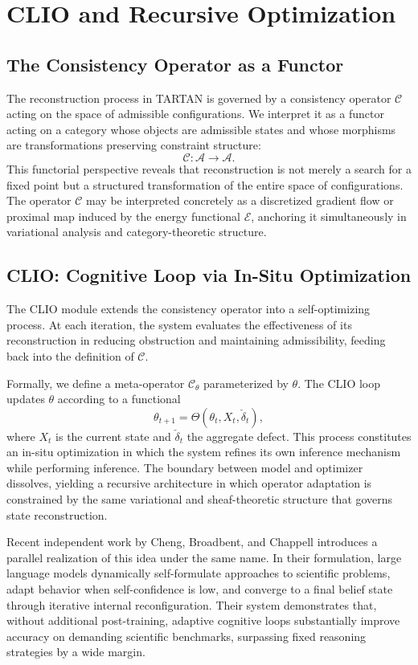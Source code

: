 \documentclass[12pt, oneside]{article}
\begin{document}
\section{CLIO and Recursive Optimization}
\label{sec:clio}

\subsection{The Consistency Operator as a Functor}

The reconstruction process in TARTAN is governed by a consistency operator $\mathcal{C}$ acting on the space of admissible configurations. We interpret it as a functor acting on a category whose objects are admissible states and whose morphisms are transformations preserving constraint structure:
\[
\mathcal{C} : \mathcal{A} \to \mathcal{A}.
\]
This functorial perspective reveals that reconstruction is not merely a search for a fixed point but a structured transformation of the entire space of configurations. The operator $\mathcal{C}$ may be interpreted concretely as a discretized gradient flow or proximal map induced by the energy functional $\mathcal{E}$, anchoring it simultaneously in variational analysis and category-theoretic structure.

\subsection{CLIO: Cognitive Loop via In-Situ Optimization}

The CLIO module extends the consistency operator into a self-optimizing process. At each iteration, the system evaluates the effectiveness of its reconstruction in reducing obstruction and maintaining admissibility, feeding back into the definition of $\mathcal{C}$.

Formally, we define a meta-operator $\mathcal{C}_\theta$ parameterized by $\theta$. The CLIO loop updates $\theta$ according to a functional
\[
\theta_{t+1} = \Theta(\theta_t, X_t, \check{\delta}_t),
\]
where $X_t$ is the current state and $\check{\delta}_t$ the aggregate defect. This process constitutes an in-situ optimization in which the system refines its own inference mechanism while performing inference. The boundary between model and optimizer dissolves, yielding a recursive architecture in which operator adaptation is constrained by the same variational and sheaf-theoretic structure that governs state reconstruction.

Recent independent work by Cheng, Broadbent, and Chappell \cite{cheng2025clio} introduces a parallel realization of this idea under the same name. In their formulation, large language models dynamically self-formulate approaches to scientific problems, adapt behavior when self-confidence is low, and converge to a final belief state through iterative internal reconfiguration. Their system demonstrates that, without additional post-training, adaptive cognitive loops substantially improve accuracy on demanding scientific benchmarks, surpassing fixed reasoning strategies by a wide margin.
\end{document}
